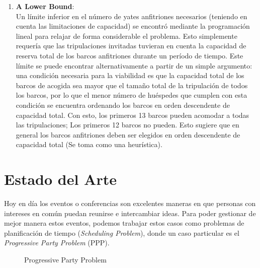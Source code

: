 \documentclass[letter, 10pt]{article}
\begin{document}
\begin{enumerate}
    \item \textbf{A Lower Bound}: \\ 
    Un límite inferior en el número de yates anfitriones necesarios (teniendo en cuenta las limitaciones de capacidad) se encontró mediante la programación lineal para relajar de forma considerable el problema. Esto simplemente requería que las tripulaciones invitadas tuvieran en cuenta la capacidad de reserva total de los barcos anfitriones durante un período de tiempo. Este límite se puede encontrar alternativamente a partir de un simple argumento: una condición necesaria para la viabilidad es que la capacidad total de los barcos de acogida sea mayor que el tamaño total de la tripulación de todos los barcos, por lo que el menor número de huéspedes que cumplen con esta condición se encuentra ordenando los barcos en orden descendente de capacidad total. Con esto, los primeros 13 barcos pueden acomodar a todas las tripulaciones; Los primeros 12 barcos no pueden. Esto sugiere que en general los barcos anfitriones deben ser elegidos en orden descendente de capacidad total (Se toma como una heurística).~\cite{Smith1996}

\end{enumerate}

\section{Estado del Arte}
Hoy en día los eventos o conferencias son excelentes maneras en que personas con intereses en común puedan reunirse e intercambiar ideas. Para poder gestionar de mejor manera estos eventos, podemos trabajar estos casos como problemas de planificación de tiempo (\textit{Scheduling Problem}), donde un caso particular es el \textit{Progressive Party Problem} (PPP). 

\begin{figure}[ht!]
 \centering
 \caption{Progressive Party Problem}
 \label{f:PPP}
\end{figure}
\end{document}
